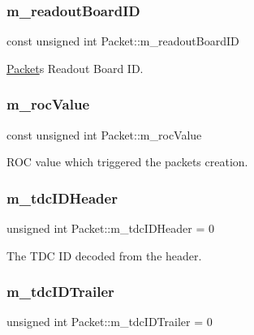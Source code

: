 \subsubsection{\texorpdfstring{m\+\_\+readout\+Board\+ID}{m\_readoutBoardID}}
{\footnotesize\ttfamily const unsigned int Packet\+::m\+\_\+readout\+Board\+ID\hspace{0.3cm}{\ttfamily [private]}}



\hyperlink{class_packet}{Packet}\textquotesingle{}s Readout Board ID. 

\mbox{\label{class_packet_ac4587a52a089f8fa1b7a899e4b46cb7d}} 
\subsubsection{\texorpdfstring{m\+\_\+roc\+Value}{m\_rocValue}}
{\footnotesize\ttfamily const unsigned int Packet\+::m\+\_\+roc\+Value\hspace{0.3cm}{\ttfamily [private]}}



R\+OC value which triggered the packet\textquotesingle{}s creation. 

\mbox{\label{class_packet_a0f39ba4b6d5a8732381c1bcbbeeb7eb9}} 
\subsubsection{\texorpdfstring{m\+\_\+tdc\+I\+D\+Header}{m\_tdcIDHeader}}
{\footnotesize\ttfamily unsigned int Packet\+::m\+\_\+tdc\+I\+D\+Header = 0\hspace{0.3cm}{\ttfamily [private]}}



The T\+DC ID decoded from the header. 

\mbox{\label{class_packet_aad739524a3b965eef89c827339b2e1f2}} 
\subsubsection{\texorpdfstring{m\+\_\+tdc\+I\+D\+Trailer}{m\_tdcIDTrailer}}
{\footnotesize\ttfamily unsigned int Packet\+::m\+\_\+tdc\+I\+D\+Trailer = 0\hspace{0.3cm}{\ttfamily [private]}}




